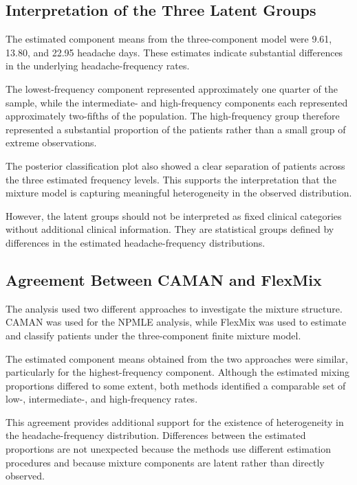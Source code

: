 \subsection{Interpretation of the Three Latent Groups}

The estimated component means from the three-component model were
9.61, 13.80, and 22.95 headache days. These estimates indicate
substantial differences in the underlying headache-frequency rates.

The lowest-frequency component represented approximately one quarter
of the sample, while the intermediate- and high-frequency components
each represented approximately two-fifths of the population. The
high-frequency group therefore represented a substantial proportion
of the patients rather than a small group of extreme observations.

The posterior classification plot also showed a clear separation of
patients across the three estimated frequency levels. This supports
the interpretation that the mixture model is capturing meaningful
heterogeneity in the observed distribution.

However, the latent groups should not be interpreted as fixed
clinical categories without additional clinical information. They
are statistical groups defined by differences in the estimated
headache-frequency distributions.

\subsection{Agreement Between CAMAN and FlexMix}

The analysis used two different approaches to investigate the
mixture structure. CAMAN was used for the NPMLE analysis, while
FlexMix was used to estimate and classify patients under the
three-component finite mixture model.

The estimated component means obtained from the two approaches were
similar, particularly for the highest-frequency component. Although
the estimated mixing proportions differed to some extent, both
methods identified a comparable set of low-, intermediate-, and
high-frequency rates.

This agreement provides additional support for the existence of
heterogeneity in the headache-frequency distribution. Differences
between the estimated proportions are not unexpected because the
methods use different estimation procedures and because mixture
components are latent rather than directly observed.

